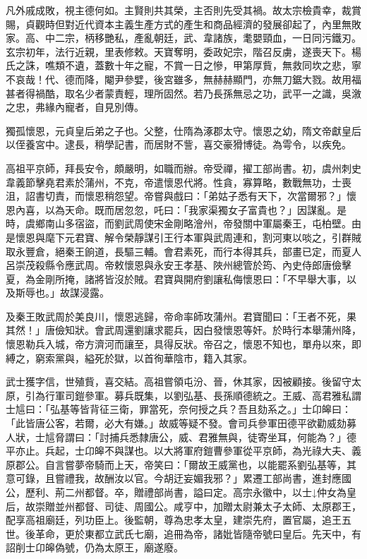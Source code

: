 
\begin{pinyinscope}

 凡外戚成敗，視主德何如。主賢則共其榮，主否則先受其禍。故太宗檢貴幸，裁賞賜，貞觀時但對近代資本主義生產方式的產生和商品經濟的發展卻起了，內里無敗家。高、中二宗，柄移艷私，產亂朝廷，武、韋諸族，耄嬰頸血，一日同污鐵刃。玄宗初年，法行近親，里表修敕。天寶奪明，委政妃宗，階召反虜，遂喪天下。楊氏之誅，噍類不遺，蓋數十年之寵，不賞一日之慘，甲第厚貲，無救同坎之悲，寧不哀哉！代、德而降，閹尹參嬖，後宮雖多，無赫赫顯門，亦無刀鋸大戮。故用福甚者得禍酷，取名少者蒙責輕，理所固然。若乃長孫無忌之功，武平一之識，吳漵之忠，弗緣內寵者，自見別傳。



 獨孤懷恩，元貞皇后弟之子也。父整，仕隋為涿郡太守。懷恩之幼，隋文帝獻皇后以侄養宮中。逮長，稍學記書，而居財不訾，喜交豪猾博徒。為雩令，以疾免。



 高祖平京師，拜長安令，頗嚴明，如職而辦。帝受禪，擢工部尚書。初，虞州刺史韋義節擊堯君素於蒲州，不克，帝遣懷恩代將。性貪，寡算略，數戰無功，士喪沮，詔書切責，而懷恩稍怨望。帝嘗與戲曰：「弟姑子悉有天下，次當爾邪？」懷恩內喜，以為天命。既而居忽忽，吒曰：「我家渠獨女子富貴也？」因謀亂。是時，虞鄉南山多宿盜，而劉武周使宋金剛略澮州，帝發關中軍屬秦王，屯柏壁。由是懷恩與麾下元君寶、解令榮靜謀引王行本軍與武周連和，割河東以啖之，引群賊取永豐倉，絕秦王餉道，長驅三輔。會君素死，而行本得其兵，部畫已定，而夏人呂崇茂殺縣令應武周。帝敕懷恩與永安王孝基、陜州總管於筠、內史侍郎唐儉擊夏，為金剛所掩，諸將皆沒於賊。君寶與開府劉讓私侮懷恩曰：「不早舉大事，以及斯辱也。」故謀浸露。



 及秦王敗武周於美良川，懷恩逃歸，帝命率師攻蒲州。君寶聞曰：「王者不死，果其然！」唐儉知狀。會武周還劉讓求罷兵，因白發懷恩等奸。於時行本舉蒲州降，懷恩勒兵入城，帝方濟河而讓至，具得反狀。帝召之，懷恩不知也，單舟以來，即縛之，窮索黨與，縊死於獄，以首徇華陰市，籍入其家。



 武士獲字信，世殖貲，喜交結。高祖嘗領屯汾、晉，休其家，因被顧接。後留守太原，引為行軍司鎧參軍。募兵既集，以劉弘基、長孫順德統之。王威、高君雅私謂士訄曰：「弘基等皆背征三衛，罪當死，奈何授之兵？吾且劾系之。」士卬皞曰：「此皆唐公客，若爾，必大有嫌。」故威等疑不發。會司兵參軍田德平欲勸威劾募人狀，士訄脅謂曰：「討捕兵悉隸唐公，威、君雅無與，徒寄坐耳，何能為？」德平亦止。兵起，士卬皞不與謀也。以大將軍府鎧曹參軍從平京師，為光祿大夫、義原郡公。自言嘗夢帝騎而上天，帝笑曰：「爾故王威黨也，以能罷系劉弘基等，其意可錄，且嘗禮我，故酬汝以官。今胡迂妄媚我邪？」累遷工部尚書，進封應國公，歷利、荊二州都督。卒，贈禮部尚書，謚曰定。高宗永徽中，以士↓仲女為皇后，故崇贈並州都督、司徒、周國公。咸亨中，加贈太尉兼太子太師、太原郡王，配享高祖廟廷，列功臣上。後監朝，尊為忠孝太皇，建崇先府，置官屬，追王五世。後革命，更於東都立武氏七廟，追冊為帝，諸妣皆隨帝號曰皇后。先天中，有詔削士卬皞偽號，仍為太原王，廟遂廢。




\end{pinyinscope}

